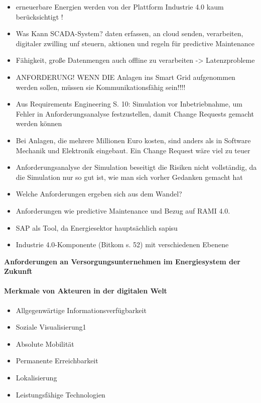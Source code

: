 \begin{itemize}
  \item erneuerbare Energien werden von der Plattform Industrie 4.0 kaum berücksichtigt !
  \item Was Kann SCADA-System? daten erfassen, an cloud senden, verarbeiten, digitaler zwilling unf steuern, aktionen und regeln für predictive Maintenance
  \item Fähigkeit, große Datenmengen auch offline zu verarbeiten -> Latenzprobleme
  \item ANFORDERUNG! WENN DIE Anlagen ins Smart Grid aufgenommen werden sollen, müssen sie Kommunikationsfähig sein!!!!
  \item Aus Requirements Engineering S. 10: Simulation vor Inbetriebnahme, um Fehler in Anforderungsanalyse festzustellen, damit Change Requests gemacht werden können
  \item Bei Anlagen, die mehrere Millionen Euro kosten, sind anders als in Software Mechanik und Elektronik eingebaut. Ein Change Request wäre viel zu teuer
  \item Anforderungsanalyse der Simulation beseitigt die Risiken nicht vollständig, da die Simulation nur so gut ist, wie man sich vorher Gedanken gemacht hat
  \item Welche Anforderungen ergeben sich aus dem Wandel?
  \item Anforderungen wie predictive Maintenance und Bezug auf RAMI 4.0.
  \item SAP als Tool, da Energiesektor hauptsächlich \acf{sapisu}
  \item Industrie 4.0-Komponente (Bitkom s. 52) mit verschiedenen Ebenene
\end{itemize}

\textbf{Anforderungen an Versorgungsunternehmen im Energiesystem der Zukunft \citep[S. 19]{Doleski2016}}

\paragraph{Merkmale von Akteuren in der digitalen Welt}
\begin{itemize}
  \item Allgegenwärtige Informationsverfügbarkeit
  \item Soziale Visualisierung1
  \item Absolute Mobilität
  \item Permanente Erreichbarkeit
  \item Lokalisierung
  \item Leistungsfähige Technologien
\end{itemize}

